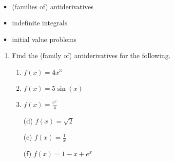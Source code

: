 \documentclass[11pt,fleqn]{article}
\begin{document}
\vspace*{-0.7in}

\begin{center}
  \Large{}\\
\end{center}
\begin{itemize}
\item (families of) antiderivatives 
\item indefinite integrals
\item initial value problems
\end{itemize}

\begin{enumerate}
\item Find the (family of) antiderivatives for the following.
\begin{multicols}{3}
	\begin{enumerate}
	\item $f(x)=4x^3$	
	\item $f(x)=5\sin(x)$	
	\item $f(x) = \frac{e^x}{4}$	
	\end{enumerate}
\end{multicols}

\vfill

\begin{multicols}{3}
	\begin{enumerate}
	\item[(d)] $f(x)=\sqrt{2}$
	\item[(e)]  $f(x)=\frac{1}{x}$
	\item[(f)] $f(x) = 1-x+e^x$
	\end{enumerate}
\end{multicols}

\vfill


\end{enumerate}
\end{document}
